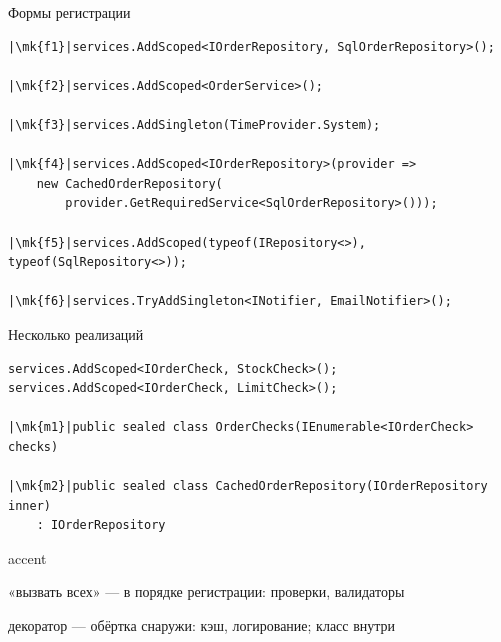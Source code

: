 \documentclass[aspectratio=169,10pt,t]{beamer}
\newcommand{\codexs}{\ttfamily\fontsize{7.0}{8.3}\selectfont}
\newcommand{\mk}[1]{\tikz[remember picture,overlay]\coordinate (#1) at (0,0.55ex);}
\begin{document}
\begin{frame}[fragile]{Формы регистрации}
  \slidetop
\begin{lstlisting}[style=csharp,basicstyle=\codexs,escapechar=|]
|\mk{f1}|services.AddScoped<IOrderRepository, SqlOrderRepository>();

|\mk{f2}|services.AddScoped<OrderService>();

|\mk{f3}|services.AddSingleton(TimeProvider.System);

|\mk{f4}|services.AddScoped<IOrderRepository>(provider =>
    new CachedOrderRepository(
        provider.GetRequiredService<SqlOrderRepository>()));

|\mk{f5}|services.AddScoped(typeof(IRepository<>), typeof(SqlRepository<>));

|\mk{f6}|services.TryAddSingleton<INotifier, EmailNotifier>();
\end{lstlisting}

\end{frame}

\begin{frame}[fragile]{Несколько реализаций}
  \slidetop
\begin{lstlisting}[style=csharp,basicstyle=\codexs,escapechar=|]
services.AddScoped<IOrderCheck, StockCheck>();
services.AddScoped<IOrderCheck, LimitCheck>();

|\mk{m1}|public sealed class OrderChecks(IEnumerable<IOrderCheck> checks)

|\mk{m2}|public sealed class CachedOrderRepository(IOrderRepository inner)
    : IOrderRepository
\end{lstlisting}

  \slidegap
  \begin{cbul}{accent}
    \item «вызвать всех» --- в порядке регистрации: проверки, валидаторы
    \item декоратор --- обёртка снаружи: кэш, логирование; класс внутри 
  \end{cbul}

\end{frame}
\end{document}
